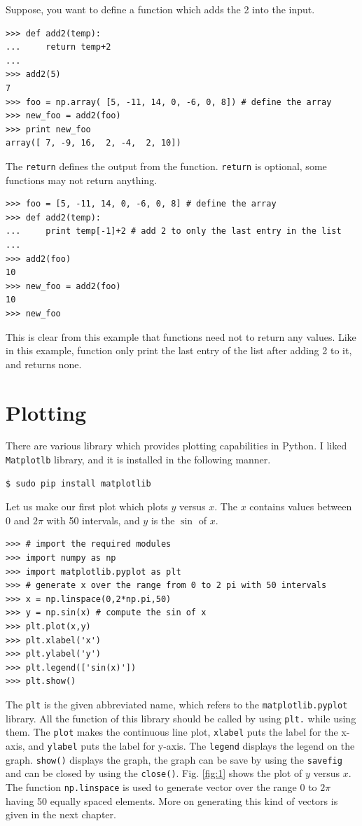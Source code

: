 \documentclass[10pt]{book}
\begin{document}
{

Suppose, you want to define a function which adds the 2 into the input.
\beforeverb
\begin{verbatim}
>>> def add2(temp):
...     return temp+2
... 
>>> add2(5)
7
>>> foo = np.array( [5, -11, 14, 0, -6, 0, 8]) # define the array
>>> new_foo = add2(foo)
>>> print new_foo
array([ 7, -9, 16,  2, -4,  2, 10])
\end{verbatim}
\afterverb
The \verb"return" defines the output from the function. \verb"return" is optional, some functions may not return anything.

\beforeverb
\begin{verbatim}
>>> foo = [5, -11, 14, 0, -6, 0, 8] # define the array
>>> def add2(temp):
...     print temp[-1]+2 # add 2 to only the last entry in the list
... 
>>> add2(foo)
10
>>> new_foo = add2(foo)
10
>>> new_foo
\end{verbatim}
\afterverb
This is clear from this example that functions need not to return any values. Like in this example, function only print the last entry of the list after adding 2 to it, and returns none.

\section{Plotting}
There are various library which provides plotting capabilities in Python. I liked \verb"Matplotlb" library, and it is installed in the following manner.
\beforeverb
\begin{verbatim}
$ sudo pip install matplotlib
\end{verbatim}
\afterverb

Let us make our first plot which plots $y$ versus $x$. The $x$ contains values between $0$ and $2 \pi$ with 50 intervals, and $y$ is the $\sin$ of $x$.

\beforeverb
\begin{verbatim}
>>> # import the required modules
>>> import numpy as np
>>> import matplotlib.pyplot as plt
>>> # generate x over the range from 0 to 2 pi with 50 intervals
>>> x = np.linspace(0,2*np.pi,50)
>>> y = np.sin(x) # compute the sin of x
>>> plt.plot(x,y)
>>> plt.xlabel('x')
>>> plt.ylabel('y')
>>> plt.legend(['sin(x)'])
>>> plt.show()
\end{verbatim}
\afterverb
{}

The \verb"plt" is the given abbreviated name, which refers to the \verb"matplotlib.pyplot" library. All the function of this library should be called by using \verb"plt." while using them. The \verb"plot" makes the continuous line plot, \verb"xlabel" puts the label for the x-axis, and \verb"ylabel" puts the label for y-axis. The \verb"legend" displays the legend on the graph. \verb"show()" displays the graph, the graph can be save by using the \verb"savefig" and can be closed by using the \verb"close()". Fig. \ref{fig:1} shows the plot of $y$ versus $x$. The function \verb"np.linspace" is used to generate vector over the range $0$ to $2 \pi$ having 50 equally spaced elements. More on generating this kind of vectors is given in the next chapter. 

}
\end{document}
